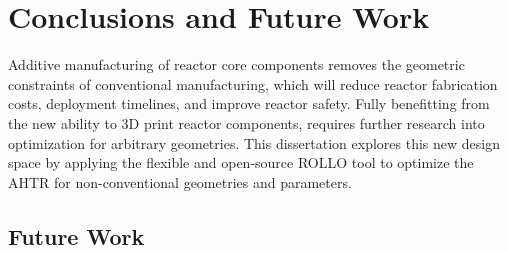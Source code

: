 \chapter{Conclusions and Future Work}
\glsresetall
\label{chap:concl}

Additive manufacturing of reactor core components removes the geometric constraints
of conventional manufacturing, which will reduce reactor fabrication costs, 
deployment timelines, and improve reactor safety. 
Fully benefitting from the new ability to 3D print reactor components, requires further 
research into optimization for arbitrary geometries. 
This dissertation explores this new design space by applying the flexible and open-source 
\gls{ROLLO} tool to optimize the \gls{AHTR} for non-conventional geometries and 
parameters. 




\section{Future Work}

